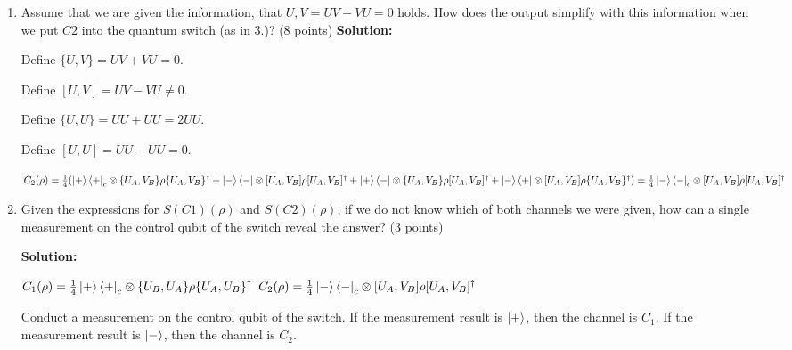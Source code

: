 \documentclass[12pt]{article}
\begin{document}
\begin{enumerate}[start=4]
    \item Assume that we are given the information, that $U, V = UV + VU = 0$ holds. How does the output simplify with this information when we put $C2$ into the quantum switch (as in 3.)? (8 points)
    \textbf{Solution:}

    Define $\{U,V\}=UV+VU=0$.

    Define $[U,V]=UV-VU\neq0$.

    Define $\{U,U\}=UU+UU=2UU$.

    Define $[U,U]=UU-UU=0$.

    $C_2(\rho) = \frac{1}{4}(
        \ket{+}\bra{+}_c\otimes \{U_A,V_B\}\rho \{U_A,V_B\}^{\dagger}
        +\ket{-}\bra{-}\otimes [U_A,V_B]\rho [U_A,V_B]^{\dagger}
        +\ket{+}\bra{-}\otimes \{U_A,V_B\}\rho [U_A,V_B]^{\dagger}
        +\ket{-}\bra{+}\otimes [U_A,V_B]\rho \{U_A,V_B\}^{\dagger}
    )
    \\=\frac{1}{4}\ket{-}\bra{-}_c\otimes [U_A,V_B]\rho [U_A,V_B]^{\dagger}
    $

    \item Given the expressions for $S(C1)(\rho)$ and $S(C2)(\rho)$, if we do not know which of both channels we were given, how can a single measurement on the control qubit of the switch reveal the answer? (3 points)
    
    \textbf{Solution:}

    $C_1(\rho)=\frac{1}{4}\ket{+}\bra{+}_c\otimes \{U_B,U_A\}\rho \{U_A,U_B\}^{\dagger}$
    $C_2(\rho)=\frac{1}{4}\ket{-}\bra{-}_c\otimes [U_A,V_B]\rho [U_A,V_B]^{\dagger}$


    Conduct a measurement on the control qubit of the switch. If the measurement result is $\ket{+}$, then the channel is $C_1$. If the measurement result is $\ket{-}$, then the channel is $C_2$.

\end{enumerate}
\end{document}
